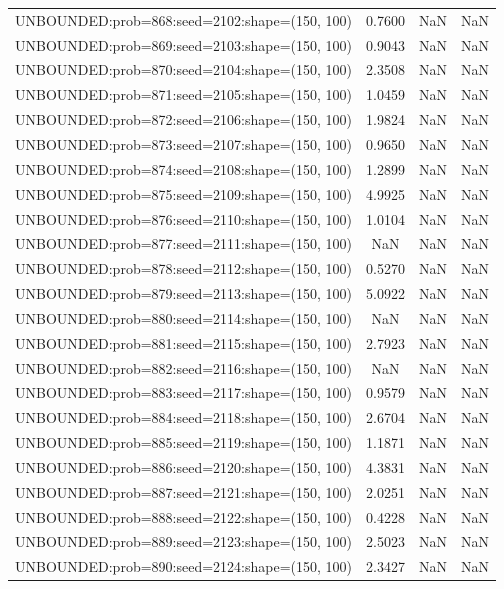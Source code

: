 \begin{longtable}{lccc}
UNBOUNDED:prob=868:seed=2102:shape=(150, 100) &  0.7600 &   NaN &    NaN \\
UNBOUNDED:prob=869:seed=2103:shape=(150, 100) &  0.9043 &   NaN &    NaN \\
UNBOUNDED:prob=870:seed=2104:shape=(150, 100) &  2.3508 &   NaN &    NaN \\
UNBOUNDED:prob=871:seed=2105:shape=(150, 100) &  1.0459 &   NaN &    NaN \\
UNBOUNDED:prob=872:seed=2106:shape=(150, 100) &  1.9824 &   NaN &    NaN \\
UNBOUNDED:prob=873:seed=2107:shape=(150, 100) &  0.9650 &   NaN &    NaN \\
UNBOUNDED:prob=874:seed=2108:shape=(150, 100) &  1.2899 &   NaN &    NaN \\
UNBOUNDED:prob=875:seed=2109:shape=(150, 100) &  4.9925 &   NaN &    NaN \\
UNBOUNDED:prob=876:seed=2110:shape=(150, 100) &  1.0104 &   NaN &    NaN \\
UNBOUNDED:prob=877:seed=2111:shape=(150, 100) &     NaN &   NaN &    NaN \\
UNBOUNDED:prob=878:seed=2112:shape=(150, 100) &  0.5270 &   NaN &    NaN \\
UNBOUNDED:prob=879:seed=2113:shape=(150, 100) &  5.0922 &   NaN &    NaN \\
UNBOUNDED:prob=880:seed=2114:shape=(150, 100) &     NaN &   NaN &    NaN \\
UNBOUNDED:prob=881:seed=2115:shape=(150, 100) &  2.7923 &   NaN &    NaN \\
UNBOUNDED:prob=882:seed=2116:shape=(150, 100) &     NaN &   NaN &    NaN \\
UNBOUNDED:prob=883:seed=2117:shape=(150, 100) &  0.9579 &   NaN &    NaN \\
UNBOUNDED:prob=884:seed=2118:shape=(150, 100) &  2.6704 &   NaN &    NaN \\
UNBOUNDED:prob=885:seed=2119:shape=(150, 100) &  1.1871 &   NaN &    NaN \\
UNBOUNDED:prob=886:seed=2120:shape=(150, 100) &  4.3831 &   NaN &    NaN \\
UNBOUNDED:prob=887:seed=2121:shape=(150, 100) &  2.0251 &   NaN &    NaN \\
UNBOUNDED:prob=888:seed=2122:shape=(150, 100) &  0.4228 &   NaN &    NaN \\
UNBOUNDED:prob=889:seed=2123:shape=(150, 100) &  2.5023 &   NaN &    NaN \\
UNBOUNDED:prob=890:seed=2124:shape=(150, 100) &  2.3427 &   NaN &    NaN \\

\end{longtable}
